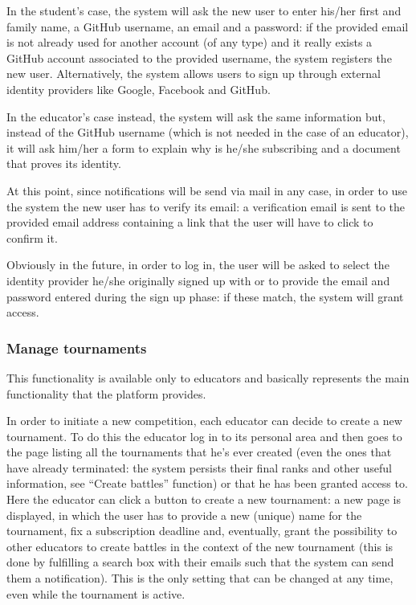 In the student’s case, the system will ask the new user to enter his/her first and family name, a GitHub username, an email and a password: if the provided email is not already used for another account (of any type) and it really exists a GitHub account associated to the provided username, the system registers the new user. Alternatively, the system allows users to sign up through external identity providers like Google, Facebook and GitHub.

In the educator’s case instead, the system will ask the same information but, instead of the GitHub username (which is not needed in the case of an educator), it will ask him/her a form to explain why is he/she subscribing and a document that proves its identity.

At this point, since notifications will be send via mail in any case, in order to use the system the new user has to verify its email: a verification email is sent to the provided email address containing a link that the user will have to click to confirm it.

Obviously in the future, in order to log in, the user will be asked to select the identity provider he/she originally signed up with or to provide the email and password entered during the sign up phase: if these match, the system will grant access.
\subsubsection{Manage tournaments}
This functionality is available only to educators and basically represents the main functionality that the platform provides.

In order to initiate a new competition, each educator can decide to create a new tournament. To do this the educator log in to its personal area and then goes to the page listing all the tournaments that he’s ever created (even the ones that have already terminated: the system persists their final ranks and other useful information, see “Create battles” function) or that he has been granted access to. Here the educator can click a button to create a new tournament: a new page is displayed, in which the user has to provide a new (unique) name for the tournament, fix a subscription deadline and, eventually, grant the possibility to other educators to create battles in the context of the new tournament (this is done by fulfilling a search box with their emails such that the system can send them a notification). This is the only setting that can be changed at any time, even while the tournament is active.
